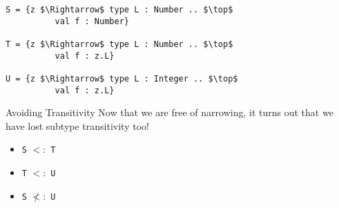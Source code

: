 \documentclass[dvipsnames]{beamer}
\begin{document}


\begin{lrbox}{\tmExTrans}
\begin{lstlisting}[mathescape, style=customlang]         
S = {z $\Rightarrow$ type L : Number .. $\top$
          val f : Number}
         
T = {z $\Rightarrow$ type L : Number .. $\top$
          val f : z.L}
         
U = {z $\Rightarrow$ type L : Integer .. $\top$
          val f : z.L}
\end{lstlisting}
\end{lrbox}

\begin{frame}{Avoiding Transitivity}
Now that we are free of narrowing, it turns out that we have lost subtype transitivity too!
\begin{block}{ }
\usebox{\tmExTrans}
\end{block}
\begin{itemize}
\item
\texttt{S} $<:$ \texttt{T}
\item
\texttt{T} $<:$ \texttt{U}
\item
\texttt{S} $\not<:$ \texttt{U}
\end{itemize}
\end{frame}
\end{document}
